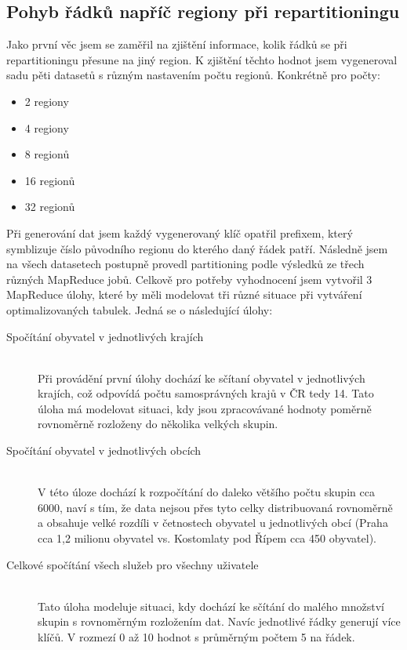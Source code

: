 \documentclass[thesis=M,czech]{FITthesis}[2012/06/26]
\begin{document}
\subsection{Pohyb řádků napříč regiony při repartitioningu}
Jako první věc jsem se zaměřil na zjištění informace, kolik řádků se při repartitioningu přesune na jiný region. K zjištění těchto hodnot jsem vygeneroval sadu pěti datasetů s různým nastavením počtu regionů. Konkrétně pro počty:
\begin{itemize}
	\item 2 regiony
	\item 4 regiony
	\item 8 regionů
	\item 16 regionů
	\item 32 regionů	
\end{itemize} 
 

Při generování dat jsem každý vygenerovaný klíč opatřil prefixem, který symblizuje číslo původního regionu do kterého daný řádek patří. Následně jsem na všech datasetech postupně provedl partitioning podle výsledků ze třech různých MapReduce jobů. Celkově pro potřeby vyhodnocení jsem vytvořil 3 MapReduce úlohy, které by měli modelovat tři různé situace při vytváření optimalizovaných tabulek. Jedná se o následující úlohy:
\begin{description}
\item [Spočítání obyvatel v jednotlivých krajích] \hfill \\
Při provádění první úlohy dochází ke sčítaní obyvatel v jednotlivých krajích, což odpovídá počtu samosprávných krajů v ČR tedy 14. Tato úloha má modelovat situaci, kdy jsou zpracovávané hodnoty poměrně rovnoměrně rozloženy do několika velkých skupin. 

\item [Spočítání obyvatel v jednotlivých obcích] \hfill \\
V této úloze dochází k rozpočítání do daleko většího počtu skupin cca 6000, naví s tím, že data nejsou přes tyto celky distribuovaná rovnoměrně a obsahuje velké rozdíli v četnostech obyvatel u jednotlivých obcí (Praha cca 1,2 milionu obyvatel vs. Kostomlaty pod Řípem cca 450 obyvatel).
\item [Celkové spočítání všech služeb pro všechny uživatele] \hfill \\
Tato úloha modeluje situaci, kdy dochází ke sčítání do malého množství skupin s rovnoměrným rozložením dat. Navíc jednotlivé řádky generují více klíčů. V rozmezí 0 až 10 hodnot s průměrným počtem 5 na řádek.
\end{description}
\end{document}
